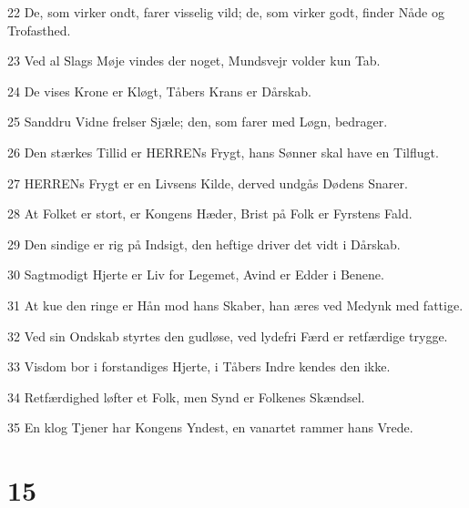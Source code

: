 \par 22 De, som virker ondt, farer visselig vild; de, som virker godt, finder Nåde og Trofasthed.
\par 23 Ved al Slags Møje vindes der noget, Mundsvejr volder kun Tab.
\par 24 De vises Krone er Kløgt, Tåbers Krans er Dårskab.
\par 25 Sanddru Vidne frelser Sjæle; den, som farer med Løgn, bedrager.
\par 26 Den stærkes Tillid er HERRENs Frygt, hans Sønner skal have en Tilflugt.
\par 27 HERRENs Frygt er en Livsens Kilde, derved undgås Dødens Snarer.
\par 28 At Folket er stort, er Kongens Hæder, Brist på Folk er Fyrstens Fald.
\par 29 Den sindige er rig på Indsigt, den heftige driver det vidt i Dårskab.
\par 30 Sagtmodigt Hjerte er Liv for Legemet, Avind er Edder i Benene.
\par 31 At kue den ringe er Hån mod hans Skaber, han æres ved Medynk med fattige.
\par 32 Ved sin Ondskab styrtes den gudløse, ved lydefri Færd er retfærdige trygge.
\par 33 Visdom bor i forstandiges Hjerte, i Tåbers Indre kendes den ikke.
\par 34 Retfærdighed løfter et Folk, men Synd er Folkenes Skændsel.
\par 35 En klog Tjener har Kongens Yndest, en vanartet rammer hans Vrede.

\chapter{15}

